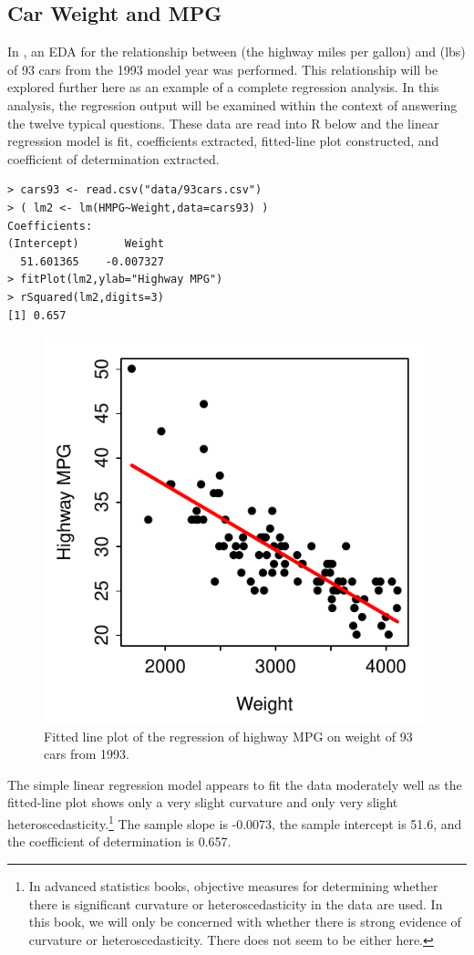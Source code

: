 \documentclass[10pt,openany]{book}\usepackage[]{graphicx}\usepackage[]{color}
\makeatletter
\newenvironment{kframe}{%
 \def\at@end@of@kframe{}%
 \ifinner\ifhmode%
  \def\at@end@of@kframe{\end{minipage}}%
  \begin{minipage}{\columnwidth}%
 \fi\fi%
 \def\FrameCommand##1{\hskip\@totalleftmargin \hskip-\fboxsep
 \colorbox{shadecolor}{##1}\hskip-\fboxsep
     \hskip-\linewidth \hskip-\@totalleftmargin \hskip\columnwidth}%
 \MakeFramed {\advance\hsize-\width
   \@totalleftmargin\z@ \linewidth\hsize
   \@setminipage}}%
 {\par\unskip\endMakeFramed%
 \at@end@of@kframe}
\newenvironment{knitrout}{}{} %
\makeatother
\begin{document}
\subsection*{Car Weight and MPG}
\vspace{-12pt}
In , an EDA for the relationship between  (the highway miles per gallon) and  (lbs) of 93 cars from the 1993 model year was performed.  This relationship will be explored further here as an example of a complete regression analysis.  In this analysis, the regression output will be examined within the context of answering the twelve typical questions.  These data are read into R below and the linear regression model is fit, coefficients extracted, fitted-line plot constructed, and coefficient of determination extracted.
\begin{knitrout}
\color{fgcolor}\begin{kframe}
\begin{verbatim}
> cars93 <- read.csv("data/93cars.csv")
> ( lm2 <- lm(HMPG~Weight,data=cars93) )
Coefficients:
(Intercept)       Weight  
  51.601365    -0.007327  
> fitPlot(lm2,ylab="Highway MPG")
> rSquared(lm2,digits=3)
[1] 0.657
\end{verbatim}
\end{kframe}\begin{figure}[hbtp]

{\centering \includegraphics[width=.4\linewidth]{Figs/CarFit-1} 

}

\caption[Fitted line plot of the regression of highway MPG on weight of 93 cars from 1993]{Fitted line plot of the regression of highway MPG on weight of 93 cars from 1993.}\label{fig:CarFit}
\end{figure}


\end{knitrout}

\vspace{-12pt}
The simple linear regression model appears to fit the data moderately well as the fitted-line plot  shows only a very slight curvature and only very slight heteroscedasticity.\footnote{In advanced statistics books, objective measures for determining whether there is significant curvature or heteroscedasticity in the data are used.  In this book, we will only be concerned with whether there is strong evidence of curvature or heteroscedasticity.  There does not seem to be either here.}  The sample slope is -0.0073, the sample intercept is 51.6, and the coefficient of determination is 0.657.
\end{document}
